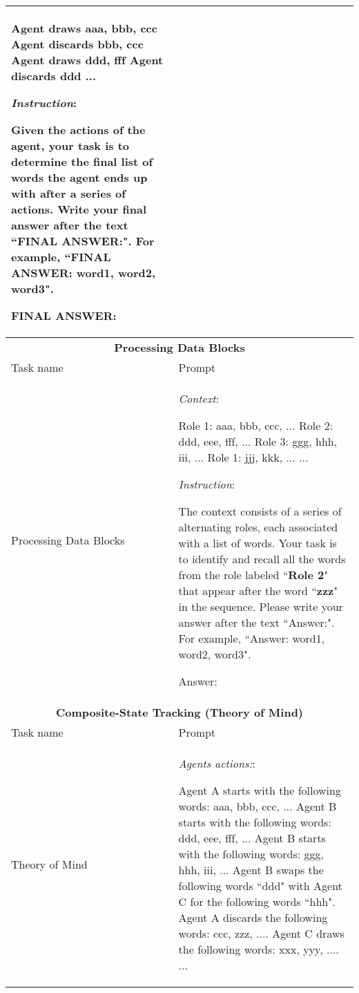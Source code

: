 \begin{longtable}{p{3cm}p{12cm}}
        Agent draws aaa, bbb, ccc\newline
        Agent discards bbb, ccc\newline
        Agent draws ddd, fff\newline
        Agent discards ddd\newline
        ...

        \textit{Instruction}:
        
        Given the actions of the agent, your task is to determine the final list of words the agent ends up with after a series of actions. Write your final answer after the text ``FINAL ANSWER:". For example, ``FINAL ANSWER: word1, word2, word3".
        
        FINAL ANSWER:\\
       
        \bottomrule

        \toprule
        \multicolumn{2}{c}{\textbf{Processing Data Blocks} } \\
        \midrule
         Task name & Prompt  \\
        \midrule
        Processing Data Blocks & \textit{Context}:
        
        Role 1: aaa, bbb, ccc, ...\newline
        Role 2: ddd, eee, fff, ...\newline
        Role 3: ggg, hhh, iii, ... \newline
        Role 1: jjj, kkk, ... \newline
        ...
        
        \textit{Instruction}:
        
        The context consists of a series of alternating roles, each associated with a list of words. Your task is to identify and recall all the words from the role labeled ``{\textbf{Role 2}}" that appear after the word ``{\textbf{zzz}}" in the sequence. Please write your answer after the text ``Answer:". For example, ``Answer: word1, word2, word3".
        
        Answer:\\
        \bottomrule
        \toprule
        \multicolumn{2}{c}{\textbf{Composite-State Tracking (Theory of Mind)} } \\
        \midrule
         Task name & Prompt  \\
        \midrule
        Theory of Mind & \textit{Agents actions:}:
        
        Agent A starts with the following words: aaa, bbb, ccc, ...\newline
        Agent B starts with the following words: ddd, eee, fff, ...\newline
        Agent B starts with the following words: ggg, hhh, iii, ...\newline
        Agent B swaps the following words ``ddd" with Agent C for the following words ``hhh". \newline
        Agent A discards the following words: ccc, zzz, .... \newline
        Agent C draws the following words: xxx, yyy, .... \newline
        ...
        

\end{longtable}
